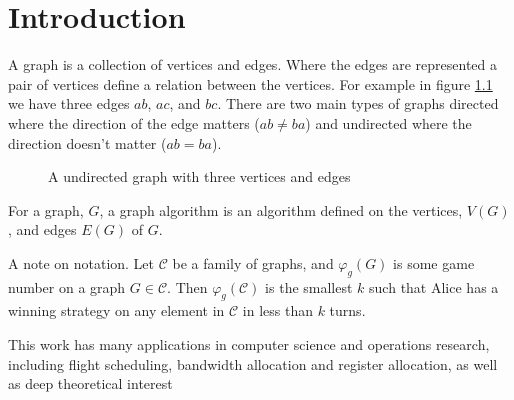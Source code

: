 \chapter{Introduction}

A graph is a collection of vertices and edges. Where the edges are represented a pair of vertices define a relation between the vertices. For example in figure \ref{fig:k3} we have three edges $ab$, $ac$, and $bc$. There are two main types of graphs directed where the direction of the edge matters ($ab\neq ba$) and undirected where the direction doesn't matter ($ab=ba$).
\begin{figure}[h]
    \centering
{}
    \caption{A undirected graph with three vertices and edges}
\label{fig:k3}
\end{figure}

For a graph, $G$, a graph algorithm is an algorithm defined on the vertices, $V(G)$, and edges $E(G)$ of $G$. 

A note on notation. Let $\mathcal{C}$ be a family of graphs, and $\varphi_g(G)$ is some game number on a graph $G \in \mathcal{C}$. Then $\varphi_g(\mathcal{C})$ is the smallest $k$ such that Alice has a winning strategy on any element in $\mathcal{C}$ in less than $k$ turns.
       
    
    
    
    
    This work has many applications in computer science and operations research, including flight scheduling, bandwidth allocation and register allocation, as well as deep theoretical interest
